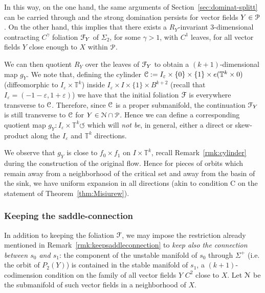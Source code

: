 \documentclass[reqno,12pt,a4paper]{amsart}
\theoremstyle{plain}
\theoremstyle{definition}
\begin{document}
In this way, on the one hand, the same arguments of
Section~\ref{sec:dominat-splitt} can be carried through and
the strong domination persists for vector fields
$Y\in{\EuScript{P}}$. On the other hand, this implies that there exists
a $R_Y$-invariant $3$-dimensional contracting $C^\gamma$
foliation ${\EuScript{F}}_Y$ of $\Sigma_2$, for some $\gamma>1$, with
$C^1$ leaves, for all vector fields $Y$ close enough to $X$
within ${\EuScript{P}}$.

We can then quotient $R_Y$ over the leaves of ${\EuScript{F}}_Y$ to
obtain a $(k+1)$-dimensional map $g_Y$.  We note that,
defining the cylinder
${\EuScript{C}}:=I_{\varepsilon}\times\{0\}\times\{1\}\times
e({{\mathbb T}}^k\times0)$ (diffeomorphic to $I_{\varepsilon}\times{{\mathbb T}}^k$)
inside $I_{\varepsilon}\times I\times\{1\}\times B^{k+2}$ (recall
that $I_{\varepsilon}=(-1-{\varepsilon},1+{\varepsilon})$) we have that the
initial foliation ${\EuScript{F}}$ is everywhere transverse to ${\EuScript{C}}$.
Therefore, since ${\EuScript{C}}$ is a proper submanifold, the
continuation ${\EuScript{F}}_Y$ is still transverse to ${\EuScript{C}}$ for
$Y\in{\EuScript{N}}\cap{\EuScript{P}}$. Hence we can define a corresponding
quotient map $g_Y:I_{\varepsilon}\times{{\mathbb T}}^k\circlearrowleft$
which will \emph{not be}, in general, either a direct or
skew-product along the $I_{\varepsilon}$ and ${{\mathbb T}}^k$ directions.

We observe that $g_Y$ is close to $f_0\times f_1$ on
$I\times{{\mathbb T}}^k$, recall Remark~\ref{rmk:cylinder} during the
construction of the original flow. Hence for pieces of
orbits which remain away from a neighborhood of the critical
set and away from the basin of the sink, we have uniform
expansion in all directions (akin to condition C on the
statement of Theorem~\ref{thm:Misiurew}). 

\subsubsection{Keeping the saddle-connection}
\label{sec:nearby-vector-fields}

In addition to keeping the foliation ${\EuScript{F}}$, we may impose
the restriction already mentioned in
Remark~\ref{rmk:keepsaddleconnection} to \emph{keep also the
  connection between $s_0$ and $s_1$}: the component of the
unstable manifold of $s_0$ through $\Sigma^+$ (i.e. the
orbit of $P_2(Y)$) is contained in the stable manifold of
$s_1$, a $(k+1)$-codimension condition on the family of all
vector fields $Y$ $C^2$ close to $X$. Let ${\EuScript{N}}$ be the
submanifold of such vector fields in a neighborhood of $X$.
\end{document}
